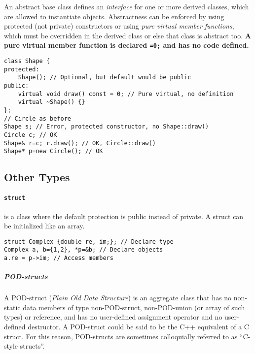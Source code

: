 			An abstract base class defines an \emph{interface} for one or more derived classes, which are allowed to instantiate objects. Abstractness can be enforced by using protected (not private) constructors or using \emph{pure virtual member functions}, which must be overridden in the derived class or else that class is abstract too. \textbf{A pure virtual member function is declared \lstinline!=0;! and has no code defined.}
			\begin{code}\begin{lstlisting}[style=list]
class Shape {
protected:
	Shape(); // Optional, but default would be public
public:
	virtual void draw() const = 0; // Pure virtual, no definition
	virtual ~Shape() {}
};
// Circle as before
Shape s; // Error, protected constructor, no Shape::draw()
Circle c; // OK
Shape& r=c; r.draw(); // OK, Circle::draw()
Shape* p=new Circle(); // OK
			\end{lstlisting}\end{code}
			
	
	\subsection{Other Types} %
		\paragraph{\lstinline!struct!} %
			
			is a class where the default protection is public instead of private. A struct can be initialized like an array.
			\begin{code}\begin{lstlisting}[style=list]
struct Complex {double re, im;}; // Declare type
Complex a, b={1,2}, *p=&b; // Declare objects
a.re = p->im; // Access members
			\end{lstlisting}\end{code}
		
			\subparagraph{POD-structs} %
				A POD-struct (\emph{Plain Old Data Structure}) is an aggregate class that has no non-static data members of type non-POD-struct, non-POD-union (or array of such types) or reference, and has no user-defined assignment operator and no user-defined destructor. A POD-struct could be said to be the C++ equivalent of a C struct. For this reason, POD-structs are sometimes colloquially referred to as ``C-style structs''.
		
